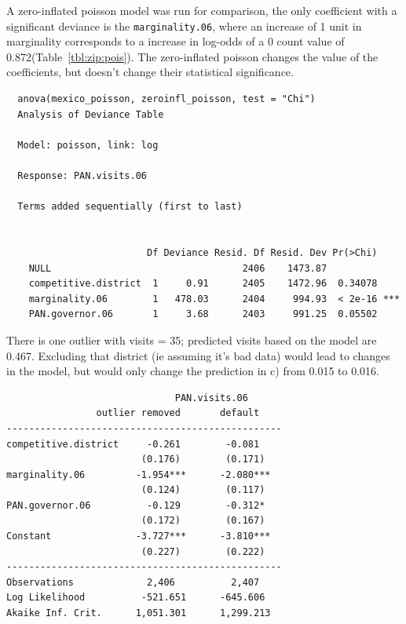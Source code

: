 \documentclass[12pt,letterpaper]{article}
\begin{document}
\begin{enumerate}
    A zero-inflated poisson model was run for comparison, the only coefficient with a significant deviance is the \texttt{marginality.06}, where an increase of 1 unit in marginality corresponds to a increase in log-odds of a 0 count value of 0.872(Table~\ref{tbl:zip:pois}).  The zero-inflated poisson changes the value of the coefficients, but doesn't change their statistical significance.
  
  
\begin{lstlisting}
  anova(mexico_poisson, zeroinfl_poisson, test = "Chi")
  Analysis of Deviance Table

  Model: poisson, link: log

  Response: PAN.visits.06

  Terms added sequentially (first to last)


                         Df Deviance Resid. Df Resid. Dev Pr(>Chi)    
    NULL                                  2406    1473.87             
    competitive.district  1     0.91      2405    1472.96  0.34078    
    marginality.06        1   478.03      2404     994.93  < 2e-16 ***
    PAN.governor.06       1     3.68      2403     991.25  0.05502 
\end{lstlisting}

  There is one outlier with visits = 35; predicted visits based on the model are 0.467.  Excluding that district (ie assuming it's bad data) would lead to changes in the model, but would only change the prediction in c) from 0.015 to  0.016.
  
  \begin{lstlisting}
                              PAN.visits.06        
                outlier removed       default     
-------------------------------------------------
competitive.district     -0.261        -0.081    
                        (0.176)        (0.171)   
marginality.06         -1.954***      -2.080***  
                        (0.124)        (0.117)   
PAN.governor.06          -0.129        -0.312*   
                        (0.172)        (0.167)   
Constant               -3.727***      -3.810***  
                        (0.227)        (0.222)   
-------------------------------------------------
Observations             2,406          2,407    
Log Likelihood          -521.651      -645.606   
Akaike Inf. Crit.      1,051.301      1,299.213  
  \end{lstlisting}

\end{enumerate}
\end{document}
